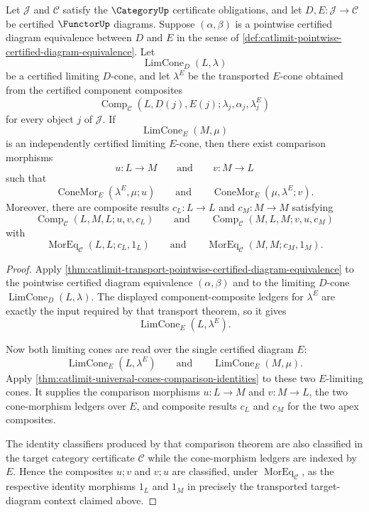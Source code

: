 \begin{theorem}
\label{thm:catlimit-transported-limiting-cone-comparison}
Let $\mathcal J$ and $\mathcal C$ satisfy the $\CategoryUp$ certificate obligations, and let $D,E:\mathcal J\to\mathcal C$ be certified $\FunctorUp$ diagrams. Suppose $(\alpha,\beta)$ is a pointwise certified diagram equivalence between $D$ and $E$ in the sense of \autoref{def:catlimit-pointwise-certified-diagram-equivalence}. Let
$$
\operatorname{LimCone}_{D}(L,\lambda)
$$
be a certified limiting $D$-cone, and let $\lambda^E$ be the transported $E$-cone obtained from the certified component composites
$$
\operatorname{Comp}_{\mathcal C}(L,D(j),E(j);\lambda_j,\alpha_j,\lambda^E_j)
$$
for every object $j$ of $\mathcal J$. If
$$
\operatorname{LimCone}_{E}(M,\mu)
$$
is an independently certified limiting $E$-cone, then there exist comparison morphisms
$$
u:L\to M
\qquad\text{and}\qquad
v:M\to L
$$
such that
$$
\operatorname{ConeMor}_{E}(\lambda^E,\mu;u)
\qquad\text{and}\qquad
\operatorname{ConeMor}_{E}(\mu,\lambda^E;v).
$$
Moreover, there are composite results $c_L:L\to L$ and $c_M:M\to M$ satisfying
$$
\operatorname{Comp}_{\mathcal C}(L,M,L;u,v,c_L)
\qquad\text{and}\qquad
\operatorname{Comp}_{\mathcal C}(M,L,M;v,u,c_M)
$$
with
$$
\operatorname{MorEq}_{\mathcal C}(L,L;c_L,1_L)
\qquad\text{and}\qquad
\operatorname{MorEq}_{\mathcal C}(M,M;c_M,1_M).
$$
\end{theorem}
\begin{proof}
Apply \autoref{thm:catlimit-transport-pointwise-certified-diagram-equivalence} to the pointwise certified diagram equivalence $(\alpha,\beta)$ and to the limiting $D$-cone $\operatorname{LimCone}_{D}(L,\lambda)$. The displayed component-composite ledgers for $\lambda^E$ are exactly the input required by that transport theorem, so it gives
$$
\operatorname{LimCone}_{E}(L,\lambda^E).
$$

Now both limiting cones are read over the single certified diagram $E$:
$$
\operatorname{LimCone}_{E}(L,\lambda^E)
\qquad\text{and}\qquad
\operatorname{LimCone}_{E}(M,\mu).
$$
Apply \autoref{thm:catlimit-universal-cones-comparison-identities} to these two $E$-limiting cones. It supplies the comparison morphisms $u:L\to M$ and $v:M\to L$, the two cone-morphism ledgers over $E$, and composite results $c_L$ and $c_M$ for the two apex composites.

The identity classifiers produced by that comparison theorem are also classified in the target category certificate $\mathcal C$ while the cone-morphism ledgers are indexed by $E$. Hence the composites $u;v$ and $v;u$ are classified, under $\operatorname{MorEq}_{\mathcal C}$, as the respective identity morphisms $1_L$ and $1_M$ in precisely the transported target-diagram context claimed above.
\end{proof}


